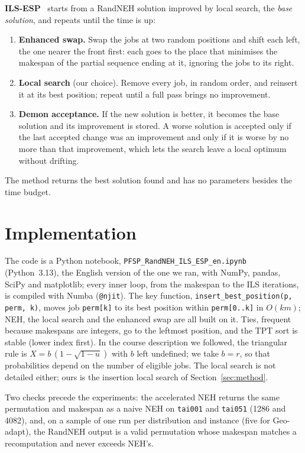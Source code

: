 \documentclass[10pt,a4paper]{article}
\begin{document}
\textbf{ILS-ESP}~\cite{juan2014} starts from a RandNEH solution improved by local search, the
\emph{base solution}, and repeats until the time is up:
\begin{enumerate}
\item \textbf{Enhanced swap.} Swap the jobs at two random positions and shift each left, the one nearer the
front first: each goes to the place that minimises the makespan of the partial sequence ending at it,
ignoring the jobs to its right.
\item \textbf{Local search} (our choice). Remove every job, in random order, and reinsert it at its best position;
repeat until a full pass brings no improvement.
\item \textbf{Demon acceptance.} If the new solution is better, it becomes the base solution and its
improvement is stored. A worse solution is accepted only if the last accepted change was an improvement
and only if it is worse by no more than that improvement, which lets the search leave a local optimum
without drifting.
\end{enumerate}
The method returns the best solution found and has no parameters besides the time budget.

\section{Implementation}
\label{sec:impl}

The code is a Python notebook, \texttt{PFSP\_RandNEH\_ILS\_ESP\_en.ipynb} (Python~3.13), the English
version of the one we ran, with NumPy, pandas, SciPy and matplotlib; every inner loop, from the makespan to the ILS iterations, is compiled with Numba
(\texttt{@njit}). The key function,
\texttt{insert\_best\_position(p, perm, k)}, moves job \texttt{perm[k]} to its best position within
\texttt{perm[0..k]} in $O(km)$; NEH, the local search and the enhanced swap are all built on it.
Ties, frequent because makespans are integers, go to the leftmost position, and the TPT sort is stable
(lower index first). In the course description we followed, the triangular rule is
$X=b\,(1-\sqrt{1-u})$ with $b$ left undefined; we take $b=r$, so that probabilities depend on the
number of eligible jobs. The local search is not detailed either; ours is the insertion local search
of Section~\ref{sec:method}.

Two checks precede the experiments: the accelerated NEH returns the same permutation and makespan as
a naive NEH on \texttt{tai001} and \texttt{tai051} (1286 and 4082), and, on a sample of one run per
distribution and instance (five for Geo-adapt), the RandNEH output is a valid permutation whose makespan matches a
recomputation and never exceeds NEH's.
\end{document}
